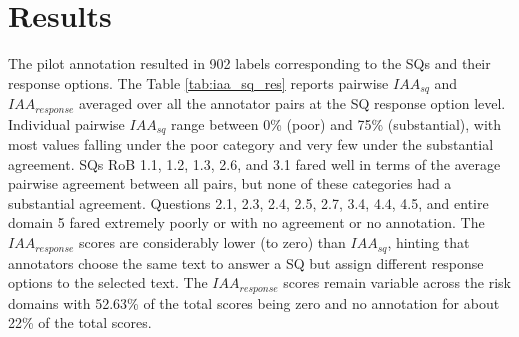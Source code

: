 \documentclass{IOS-Book-Article}
\begin{document}
\section{Results}
\label{sec:results}
%
The pilot annotation resulted in 902 labels corresponding to the SQs and their response options.
The Table \ref{tab:iaa_sq_res} reports pairwise $IAA_{sq}$ and $IAA_{response}$ averaged over all the annotator pairs at the SQ response option level.
Individual pairwise $IAA_{sq}$ range between 0\% (poor) and 75\% (substantial), with most values falling under the poor category and very few under the substantial agreement.
SQs RoB 1.1, 1.2, 1.3, 2.6, and 3.1 fared well in terms of the average pairwise agreement between all pairs, but none of these categories had a substantial agreement.
Questions 2.1, 2.3, 2.4, 2.5, 2.7, 3.4, 4.4, 4.5, and entire domain 5 fared extremely poorly or with no agreement or no annotation.
The $IAA_{response}$ scores are considerably lower (to zero) than $IAA_{sq}$, hinting that annotators choose the same text to answer a SQ but assign different response options to the selected text. 
The $IAA_{response}$ scores remain variable across the risk domains with 52.63\% of the total scores being zero and no annotation for about 22\% of the total scores.
%
\end{document}

